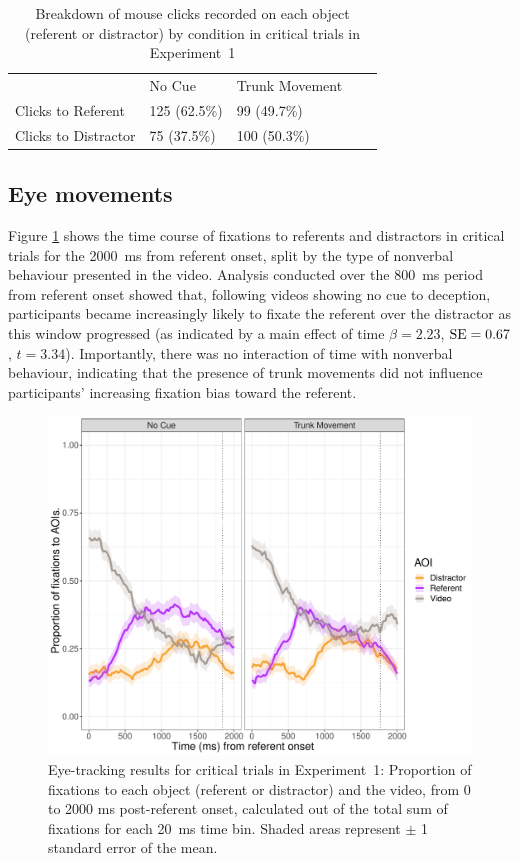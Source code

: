 \documentclass[a4paper,man,natbib]{apa6}
\newcommand{\resultsLM}[3]{$\beta = #1$, $\textnormal{SE} = #2$, $t #3$}
\begin{document}
\begin{table}
\caption{Breakdown of mouse clicks recorded on each object (referent or distractor) by condition in critical trials in Experiment~1}
\label{table:v1_clicks}
\begin{tabularx}{\linewidth}{YYYYY}
\hline
& No Cue & Trunk Movement \\
Clicks to Referent & 125 (62.5\%) & 99 (49.7\%) \\ 
Clicks to Distractor & 75 (37.5\%) & 100 (50.3\%) \\
\hline
\end{tabularx}
\end{table}

\subsection{Eye movements}
Figure \ref{fig:v1_eye1} shows the time course of fixations to referents and distractors in critical trials for the 2000~ms from referent onset, split by the type of nonverbal behaviour presented in the video.
Analysis conducted over the 800~ms period from referent onset showed that, following videos showing no cue to deception, participants became increasingly likely to fixate the referent over the distractor as this window progressed (as indicated by a main effect of time \resultsLM{2.23}{0.67}{=3.34}).
Importantly, there was no interaction of time with nonverbal behaviour, indicating that the presence of trunk movements did not influence participants' increasing fixation bias toward the referent.

\begin{figure}[Ht]
  \centering
	\includegraphics[width=\linewidth]{./img/e7_fixations_crit.pdf}
  \caption{Eye-tracking results for critical trials in Experiment~1: Proportion of fixations to each object (referent or distractor) and the video, from 0 to 2000 ms post-referent onset, calculated out of the total sum of fixations for each 20~ms time bin. Shaded areas represent $\pm$ 1 standard error of the mean.}
  \label{fig:v1_eye1}
\end{figure}
\end{document}
